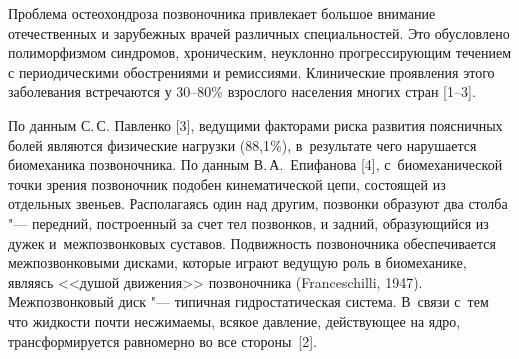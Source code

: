 


\date{04/IX/2009}


\maketitle

\small


Проблема остеохондроза позвоночника привлекает большое внимание
отечественных и зарубежных врачей различных специальностей. Это обусловлено
полиморфизмом синдромов, хроническим, неуклонно прогрессирующим течением с
периодическими обострениями и ремиссиями. Клинические проявления этого
заболевания встречаются у 30--80{\%} взрослого населения многих стран [1--3].

По данным С.\,С. Павленко [3], ведущими факторами риска развития поясничных
болей являются физические нагрузки (88,1{\%}), в~результате чего нарушается
биомеханика позвоночника.
По данным В.\,А.~Епифанова [4], с~биомеханической точки зрения позвоночник подобен
кинематической цепи, состоящей из отдельных звеньев.
Располагаясь один над другим, позвонки образуют два столба "---
передний, построенный за счет тел позвонков, и задний, образующийся из дужек и~межпозвонковых суставов.
Подвижность позвоночника обеспечивается межпозвонковыми дисками, которые играют ведущую роль в биомеханике, являясь <<душой движения>> позвоночника (Franceschilli, 1947).
Межпозвонковый диск "--- типичная гидростатическая система.
В~связи с~тем что жидкости почти несжимаемы, всякое  давление, действующее на ядро, трансформируется
равномерно во все стороны~[2].

